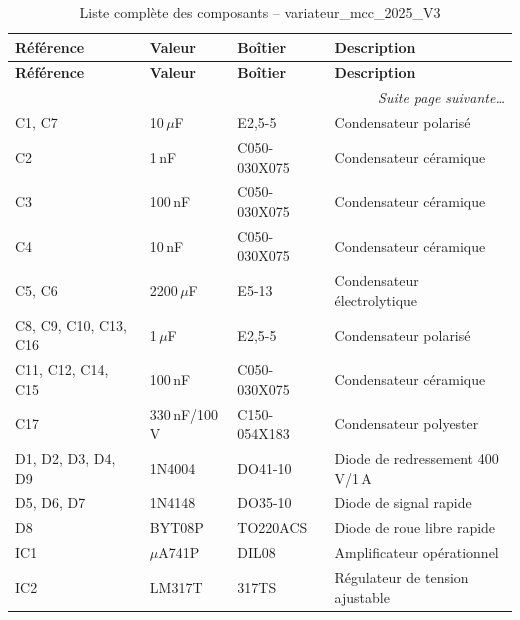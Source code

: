 \documentclass[a4paper,12pt,openany]{book}
\begin{document}
\begin{longtable}{|p{3.8cm}|p{3cm}|p{3.5cm}|p{5.5cm}|}
  \caption{Liste compl\`ete des composants -- variateur\_mcc\_2025\_V3} \label{tab:bom} \\
  \hline
  \textbf{R\'ef\'erence} & \textbf{Valeur} & \textbf{Bo\^itier} & \textbf{Description} \\
  \hline
  \endfirsthead
  \hline
  \textbf{R\'ef\'erence} & \textbf{Valeur} & \textbf{Bo\^itier} & \textbf{Description} \\
  \hline \endhead
  \hline \multicolumn{4}{r}{\textit{Suite page suivante\ldots}} \\ \endfoot
  \hline \endlastfoot
  C1, C7                        & 10\,$\mu$F      & E2,5-5        & Condensateur polaris\'e \\
  C2                            & 1\,nF           & C050-030X075  & Condensateur c\'eramique \\
  C3                            & 100\,nF         & C050-030X075  & Condensateur c\'eramique \\
  C4                            & 10\,nF          & C050-030X075  & Condensateur c\'eramique \\
  C5, C6                        & 2200\,$\mu$F    & E5-13         & Condensateur \'electrolytique \\
  C8, C9, C10, C13, C16        & 1\,$\mu$F       & E2,5-5        & Condensateur polaris\'e \\
  C11, C12, C14, C15           & 100\,nF         & C050-030X075  & Condensateur c\'eramique \\
  C17                           & 330\,nF/100\,V  & C150-054X183  & Condensateur polyester \\
  \hline
  D1, D2, D3, D4, D9           & 1N4004          & DO41-10       & Diode de redressement 400\,V/1\,A \\
  D5, D6, D7                   & 1N4148          & DO35-10       & Diode de signal rapide \\
  D8                            & BYT08P          & TO220ACS      & Diode de roue libre rapide \\
  \hline
  IC1                           & $\mu$A741P      & DIL08         & Amplificateur op\'erationnel \\
  IC2                           & LM317T          & 317TS         & R\'egulateur de tension ajustable \\

\end{longtable}
\end{document}
